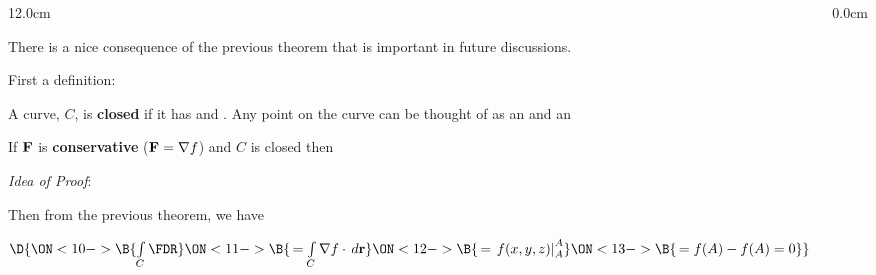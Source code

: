 \begin{frame}
\begin{columns}\begin{column}{12.0cm}

\vspace{0.1cm}

\scriptsize

There is a nice consequence of the previous theorem that is important in future discussions.

\vspace{0.4cm}

First a definition:

\vspace{0.4cm}

\DEF A curve, $C$, is {\bf closed} if it has 
 and 
.  Any point on the curve can be thought of as an
 and an

\vspace{0.5cm}

\THM If ${\bf F}$ is {\bf conservative} (${\bf F} = \nabla f$) and $C$ is closed then

\vspace{0.1cm}

\begin{center}
\end{center}

\vspace{0.2cm}

{\em Idea of Proof}:  

\vspace{0.3cm}

Then from the previous theorem, we have

\vspace{0.4cm}

\begin{center}
	$\D{
	\ON<10->{\B{\int \limits_{C} \FDR }}
	\ON<11->{\B{\, = \int \limits_{C} \nabla f \cdot \, d{\bf r} }}
	\ON<12->{\B{\, = \left.f(x,y,z)\right|_A^A }}
	\ON<13->{\B{\, = f(A) - f(A) = 0}}}$
\end{center}

\vspace{0.8cm}

\end{column}\begin{column}{0.0cm}\end{column}\end{columns}
\end{frame}

